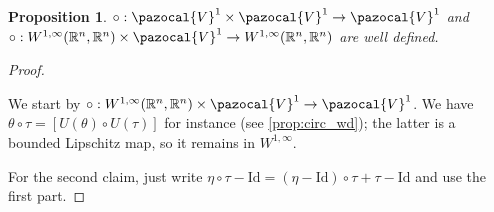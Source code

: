 \documentclass[english,a4paper,10pt,oneside]{scrbook}	%
\theoremstyle{break}
\newtheorem{prop}[equation]{Proposition}
\newenvironment{mproof}[1][\proofname]{%
  \begin{proof}[#1]$ $\par\nobreak\ignorespaces
}{%
  \end{proof}
}
\renewcommand*{\proofname}{Proof}
\theoremstyle{remark}
\newcommand{\mR}{\mathbb{R}}
\newcommand{\cV}{\pazocal{V}}
\newcommand{\id}{\text{Id}}
\newcommand{\te}{\theta}
\begin{document}
\begin{prop}
\label{prop:circ_wd_V}
$\circ: \cV^1 \times \cV^1 \rightarrow \cV^1$ and $\circ:W^{1,\infty}(\mR^n,\mR^n) \times \cV^1 \rightarrow W^{1,\infty}(\mR^n,\mR^n)$ are well defined.
\end{prop}
\begin{mproof}

We start by $\circ:W^{1,\infty}(\mR^n,\mR^n) \times \cV^1 \rightarrow \cV^1$. We have $\te\circ \tau =[ U(\te)\circ U(\tau)]$ for instance (see \cref{prop:circ_wd}); the latter is a bounded Lipschitz map, so it remains in $W^{1,\infty}$.

For the second claim, just write $\eta \circ \tau -\id = (\eta - \id)\circ \tau + \tau -\id$ and use the first part. 

\end{mproof}
\end{document}

